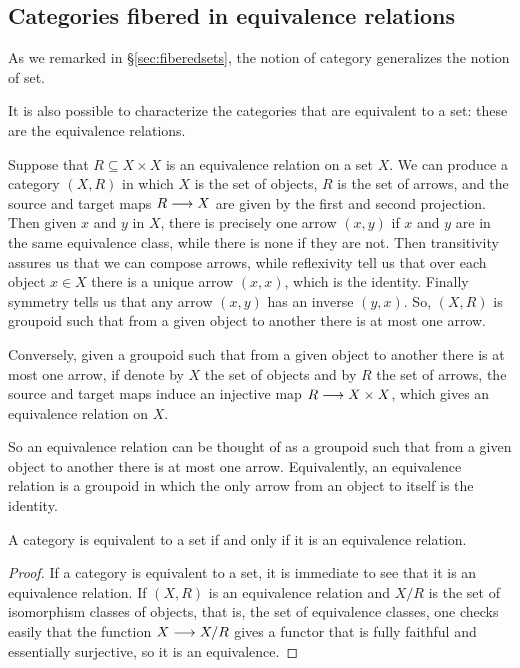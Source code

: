 \begin{3   FIBERED CATEGORIES}
\begin{3.5 Equivalences of fibered categories}
\subsection{Categories fibered in equivalence relations}\label{subsec:fibered-eq-relations}

As we remarked in \S\ref{sec:fiberedsets}, the notion of category generalizes the notion of set.

It is also possible to characterize the categories that are equivalent to a set: these are the equivalence relations.

Suppose that $R \subseteq X \times X$ is an equivalence relation on a set $X$. We can produce a category $(X,R)$ in which $X$ is the set of objects, $R$ is the set of arrows, and the source and target maps $R \arr X$ are given by the first and second projection. Then given $x$ and $y$ in $X$, there is precisely one arrow $(x,y)$ if $x$ and $y$ are in the same equivalence class, while there is none if they are not. Then transitivity assures us that we can compose arrows, while reflexivity tell us that over each object $x \in X$ there is a unique arrow $(x,x)$, which is the identity. Finally symmetry tells us that any arrow $(x,y)$ has an inverse $(y,x)$. So, $(X, R)$ is groupoid such that from a given object to another there is at most one arrow.

Conversely, given a groupoid such that from a given object to another there is at most one arrow, if denote by $X$ the set of objects and by $R$ the set of arrows, the source and target maps induce an injective map $R \arr X \times X$, which gives an equivalence relation on $X$.

So an equivalence relation can be thought of as a groupoid such that from a given object to another there is at most one arrow. Equivalently, an equivalence relation is a groupoid in which the only arrow from an object to itself is the identity.

\begin{proposition}\label{prop:equivalentset}
A category is equivalent to a set if and only if it is an equivalence relation.
\end{proposition}

\begin{proof}
If a category is equivalent to a set, it is immediate to see that it is an equivalence relation. If $(X, R)$  is an equivalence relation and $X/R$ is the set of isomorphism classes of objects, that is, the set of equivalence classes, one checks easily that the function $X \arr X/R$ gives a functor that is fully faithful and essentially surjective, so it is an equivalence.
\end{proof}



\end{3.5 Equivalences of fibered categories}
\end{3   FIBERED CATEGORIES}
